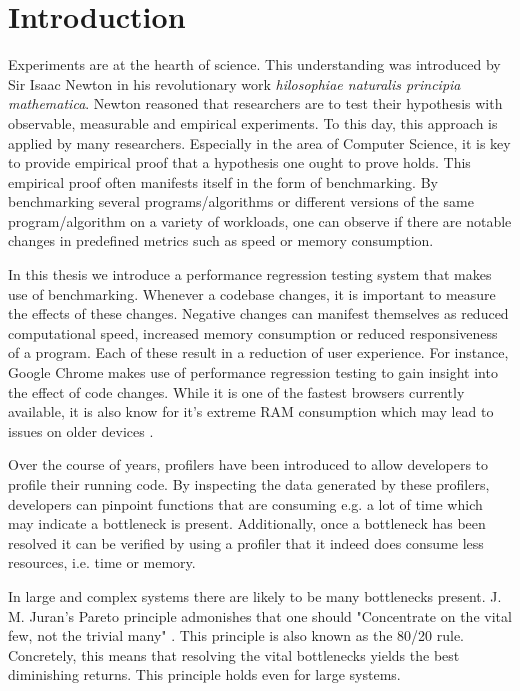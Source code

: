 \chapter{Introduction}
\label{chp:introduction}

Experiments are at the hearth of science.
This understanding was introduced by Sir Isaac Newton in his revolutionary work \emph{hilosophiae naturalis principia mathematica}.
Newton reasoned that researchers are to test their hypothesis with observable, measurable and empirical experiments.
To this day, this approach is applied by many researchers.
Especially in the area of Computer Science, it is key to provide empirical proof that a hypothesis one ought to prove holds.
This empirical proof often manifests itself in the form of benchmarking.
By benchmarking several programs/algorithms or different versions of the same program/algorithm on a variety of workloads, one can observe if there are notable changes in predefined metrics such as speed or memory consumption.

In this thesis we introduce a performance regression testing system that makes use of benchmarking.
Whenever a codebase changes, it is important to measure the effects of these changes.
Negative changes can manifest themselves as reduced computational speed, increased memory consumption or reduced responsiveness of a program.
Each of these result in a reduction of user experience.
For instance, Google Chrome makes use of performance regression testing to gain insight into the effect of code changes.
While it is one of the fastest browsers currently available, it is also know for it's extreme RAM consumption which may lead to issues on older devices \cite{ram2012chrome}.

Over the course of years, profilers have been introduced to allow developers to profile their running code.
By inspecting the data generated by these profilers, developers can pinpoint functions that are consuming e.g. a lot of time which may indicate a bottleneck is present.
Additionally, once a bottleneck has been resolved it can be verified by using a profiler that it indeed does consume less resources, i.e. time or memory.

In large and complex systems there are likely to be many bottlenecks present.
J. M. Juran's Pareto principle admonishes that one should "Concentrate on the vital few, not the trivial many" \cite{ammons2004finding}. This principle is also known as the 80/20 rule.
Concretely, this means that resolving the vital bottlenecks yields the best diminishing returns.
This principle holds even for large systems.

